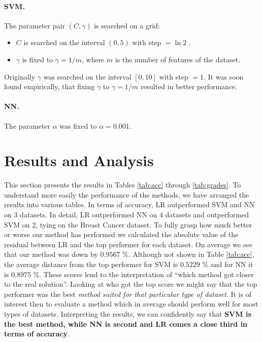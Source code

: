 \documentclass{INGUADY}
\begin{document}
\begin{body}
\paragraph{\textbf{SVM.}}
The parameter pair $(C, \gamma)$ is searched on a grid:
\begin{itemize}
\item $C$ is searched on the interval $(0, 5)$ with step $ = \ln 2$ .
\item $\gamma$ is fixed to $\gamma = 1 / m$, where $m$ is the number of features of the dataset.
\end{itemize}
Originally $\gamma$ was searched on the interval $[0, 10]$ with step $= 1$. It was soon found empirically, that fixing $\gamma$ to $\gamma = 1 / m$ resulted in better performance.

\paragraph{\textbf{NN.}}
The parameter $\alpha$ was fixed to $\alpha = 0.001$.

\section{Results and Analysis}
This section presents the results in Tables \ref{tab:acc} through \ref{tab:grades}. To understand more easily the performance of the methods, we have arranged the results into various tables. In terms of accuracy,  LR outperformed SVM and NN on 3 datasets. In detail, LR outperformed NN on 4 datasets and outperformed SVM on 2, tying on the Breast Cancer dataset. To fully grasp how much better or worse our method has performed we calculated the absolute value of the residual between LR and the top performer for each dataset. On average we see that our method was down by $0.9567$ \%. Although not shown in Table \ref{tab:acc}, the average distance from the top performer for SVM is $0.5229$ \% and for NN it is $0.8975$ \%. These scores lend to the interpretation of ``which method got closer to the real solution''. Looking at who got the top score we might say that the top performer was the best \textit{method suited for that particular type of dataset}. It is of interest then to evaluate a method which in average should perform well for most types of datasets. Interpreting the results, we can confidently say that \textbf{SVM is the best method, while NN is second and LR comes a close third in terms of accuracy}.


\end{body}
\end{document}

